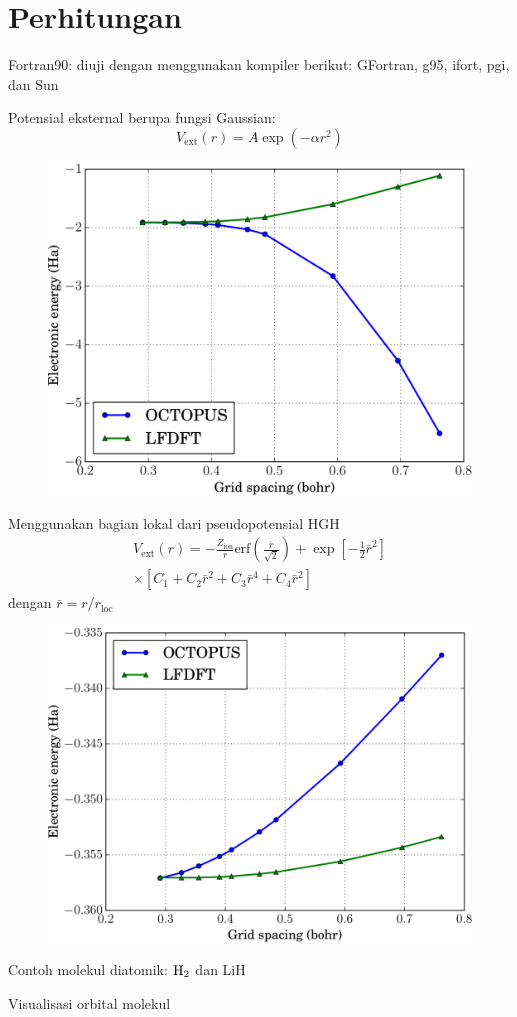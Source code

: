 \section{Perhitungan}

Fortran90:
diuji dengan menggunakan kompiler berikut: GFortran, g95, ifort, pgi, dan Sun

Potensial eksternal berupa fungsi Gaussian:
\begin{equation}
V_{\mathrm{ext}}(r) = A\exp(-\alpha r^2)
\end{equation}

\begin{figure}[h]
\includegraphics[width=\columnwidth]{images/A_10_alpha_3.pdf}
\end{figure}

Menggunakan bagian lokal dari pseudopotensial HGH
\begin{multline}
V_{\mathrm{ext}}(r) = -\frac{Z_\mathrm{ion}}{r}
\mathrm{erf}\left(\frac{\bar{r}}{\sqrt{2}}\right) +
\exp\left[-\frac{1}{2}\bar{r}^2\right] \\ 
\times
\left[
C_{1} + C_{2}\bar{r}^2 + C_{3}\bar{r}^4 + C_{4}\bar{r}^2
\right]
\end{multline}
dengan $\bar{r} = r/r_{\mathrm{loc}}$

\begin{figure}[h]
\includegraphics[width=\columnwidth]{images/atom_H.pdf}
\end{figure}

Contoh molekul diatomik: $\ce{H2}$ dan LiH

Visualisasi orbital molekul
